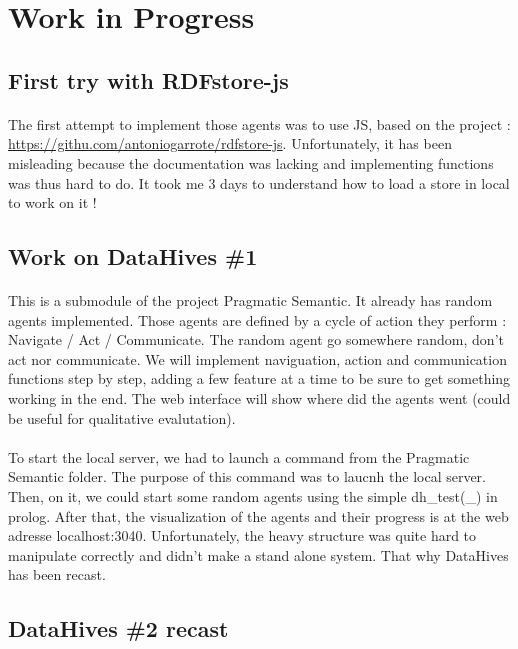\documentclass{article}
\begin{document}
\section{Work in Progress}
	\subsection{First try with RDFstore-js}
		\paragraph{} The first attempt to implement those agents was to use JS, based on the project :
		\url{https://githu.com/antoniogarrote/rdfstore-js}.
		Unfortunately, it has been misleading because the documentation was lacking
		and implementing functions was thus hard to do.
		It took me 3 days to understand how to load a store in local to work on it !
	\subsection{Work on DataHives \#1}
		\paragraph{} This is a submodule of the project Pragmatic Semantic.
		It already has random agents implemented.
		Those agents are defined by a cycle of action they perform : Navigate / Act / Communicate.
		The random agent go somewhere random, don't act nor communicate.
		We will implement naviguation, action and communication functions step by step,
		adding a few feature at a time to be sure to get something working in the end.
		The web interface will show where did the agents went (could be useful for qualitative evalutation).
		\paragraph{} To start the local server, we had to launch a command from the Pragmatic Semantic folder.
		The purpose of this command was to laucnh the local server.
		Then, on it, we could start some random agents using the simple dh\_test(\_) in prolog.
		After that, the visualization of the agents and their progress is at the web adresse localhost:3040.
		Unfortunately, the heavy structure was quite hard to manipulate correctly and didn't make a stand alone system.
		That why DataHives has been recast.
	\subsection{DataHives \#2 recast}
\end{document}
